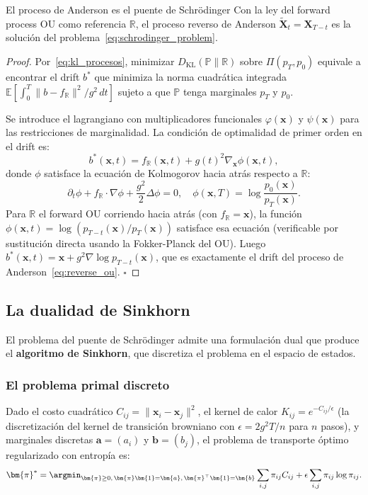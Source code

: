 \begin{proposicion}{El proceso de Anderson es el puente de Schrödinger}
\label{prop:anderson_schrodinger}
Con la ley del forward process OU como referencia $\mathbb{R}$, el proceso
reverso de Anderson $\tilde{\bm{X}}_t = \bm{X}_{T-t}$ es la solución del
problema~\eqref{eq:schrodinger_problem}.
\end{proposicion}

\begin{proof}
Por~\eqref{eq:kl_procesos}, minimizar $D_{\mathrm{KL}}(\mathbb{P}\|\mathbb{R})$
sobre $\Pi(p_T,p_0)$ equivale a encontrar el drift $b^*$ que minimiza la
norma cuadrática integrada $\mathbb{E}[\int_0^T\|b-f_{\mathbb{R}}\|^2/g^2\,dt]$
sujeto a que $\mathbb{P}$ tenga marginales $p_T$ y $p_0$.

Se introduce el lagrangiano con multiplicadores funcionales $\varphi(\bm{x})$
y $\psi(\bm{x})$ para las restricciones de marginalidad. La condición de
optimalidad de primer orden en el drift es:
\[
  b^*(\bm{x},t) = f_{\mathbb{R}}(\bm{x},t) + g(t)^2\nabla_{\bm{x}}\phi(\bm{x},t),
\]
donde $\phi$ satisface la ecuación de Kolmogorov hacia atrás respecto a
$\mathbb{R}$:
\[
  \partial_t\phi + f_{\mathbb{R}}\cdot\nabla\phi + \frac{g^2}{2}\Delta\phi = 0,
  \quad \phi(\bm{x},T) = \log\frac{p_0(\bm{x})}{p_T(\bm{x})}.
\]
Para $\mathbb{R}$ el forward OU corriendo hacia atrás (con $f_{\mathbb{R}} = \bm{x}$),
la función $\phi(\bm{x},t) = \log(p_{T-t}(\bm{x})/p_T(\bm{x}))$ satisface
esa ecuación (verificable por sustitución directa usando la Fokker-Planck del OU).
Luego $b^*(\bm{x},t) = \bm{x} + g^2\nabla\log p_{T-t}(\bm{x})$,
que es exactamente el drift del proceso de Anderson~\eqref{eq:reverse_ou}. $\square$
\end{proof}

\subsection{La dualidad de Sinkhorn}
\label{subsec:sinkhorn_dualidad}

El problema del puente de Schrödinger admite una formulación dual que produce
el \textbf{algoritmo de Sinkhorn}, que discretiza el problema en el espacio
de estados.

\subsubsection*{El problema primal discreto}

Dado el costo cuadrático $C_{ij} = \|\bm{x}_i-\bm{x}_j\|^2$, el kernel de
calor $K_{ij} = e^{-C_{ij}/\epsilon}$ (la discretización del kernel de
transición browniano con $\epsilon = 2g^2 T/n$ para $n$ pasos), y marginales
discretas $\bm{a} = (a_i)$ y $\bm{b} = (b_j)$, el problema de transporte
óptimo regularizado con entropía es:
\begin{equation}
  \bm{\pi}^* = \argmin_{\bm{\pi}\geq 0,\,\bm{\pi}\bm{1}=\bm{a},\,\bm{\pi}^\top\bm{1}=\bm{b}}
  \sum_{i,j}\pi_{ij}C_{ij} + \epsilon\sum_{i,j}\pi_{ij}\log\pi_{ij}.
  \label{eq:sinkhorn_primal}
\end{equation}

